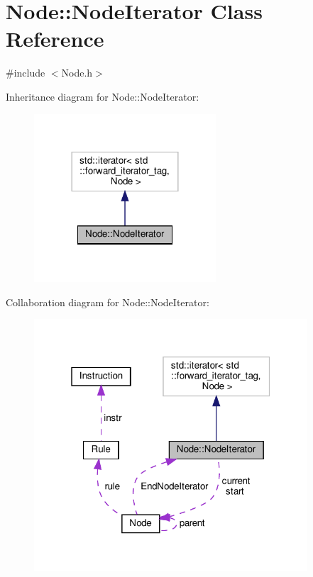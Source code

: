 \hypertarget{class_node_1_1_node_iterator}{}\section{Node\+:\+:Node\+Iterator Class Reference}
\label{class_node_1_1_node_iterator}


{\ttfamily \#include $<$Node.\+h$>$}



Inheritance diagram for Node\+:\+:Node\+Iterator\+:
\nopagebreak
\begin{figure}[H]
\begin{center}
\leavevmode
\includegraphics[width=192pt]{class_node_1_1_node_iterator__inherit__graph}
\end{center}
\end{figure}


Collaboration diagram for Node\+:\+:Node\+Iterator\+:
\nopagebreak
\begin{figure}[H]
\begin{center}
\leavevmode
\includegraphics[width=289pt]{class_node_1_1_node_iterator__coll__graph}
\end{center}
\end{figure}
